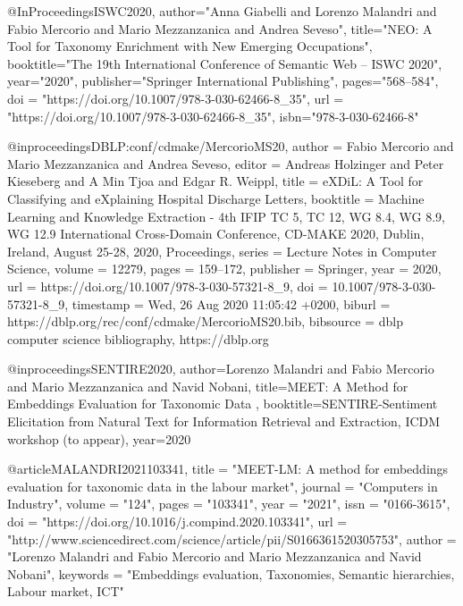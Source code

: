{@InProceedings{ISWC2020,
author="Anna Giabelli and  Lorenzo Malandri and Fabio Mercorio and Mario Mezzanzanica and Andrea Seveso",
title="NEO: A Tool for Taxonomy Enrichment with New Emerging Occupations",
booktitle="The 19th International Conference of Semantic Web -- ISWC 2020",
year="2020",
publisher="Springer International Publishing",
pages="568--584",
doi = "https://doi.org/10.1007/978-3-030-62466-8_35",
url = "https://doi.org/10.1007/978-3-030-62466-8_35",
isbn="978-3-030-62466-8"
}



@inproceedings{DBLP:conf/cdmake/MercorioMS20,
  author    = {Fabio Mercorio and
               Mario Mezzanzanica and
               Andrea Seveso},
  editor    = {Andreas Holzinger and
               Peter Kieseberg and
               A Min Tjoa and
               Edgar R. Weippl},
  title     = {eXDiL: {A} Tool for Classifying and eXplaining Hospital Discharge
               Letters},
  booktitle = {Machine Learning and Knowledge Extraction - 4th {IFIP} {TC} 5, {TC}
               12, {WG} 8.4, {WG} 8.9, {WG} 12.9 International Cross-Domain Conference,
               {CD-MAKE} 2020, Dublin, Ireland, August 25-28, 2020, Proceedings},
  series    = {Lecture Notes in Computer Science},
  volume    = {12279},
  pages     = {159--172},
  publisher = {Springer},
  year      = {2020},
  url       = {https://doi.org/10.1007/978-3-030-57321-8\_9},
  doi       = {10.1007/978-3-030-57321-8\_9},
  timestamp = {Wed, 26 Aug 2020 11:05:42 +0200},
  biburl    = {https://dblp.org/rec/conf/cdmake/MercorioMS20.bib},
  bibsource = {dblp computer science bibliography, https://dblp.org}
}


@inproceedings{SENTIRE2020,
author={Lorenzo Malandri and Fabio Mercorio and  Mario Mezzanzanica and Navid Nobani},
title={MEET: A Method for Embeddings Evaluation for Taxonomic Data },
booktitle={SENTIRE-Sentiment Elicitation from Natural Text for Information Retrieval and Extraction, ICDM workshop (to appear)},
year={2020}
}

@article{MALANDRI2021103341,
title = "MEET-LM: A method for embeddings evaluation for taxonomic data in the labour market",
journal = "Computers in Industry",
volume = "124",
pages = "103341",
year = "2021",
issn = "0166-3615",
doi = "https://doi.org/10.1016/j.compind.2020.103341",
url = "http://www.sciencedirect.com/science/article/pii/S0166361520305753",
author = "Lorenzo Malandri and Fabio Mercorio and Mario Mezzanzanica and Navid Nobani",
keywords = "Embeddings evaluation, Taxonomies, Semantic hierarchies, Labour market, ICT"
}

}
